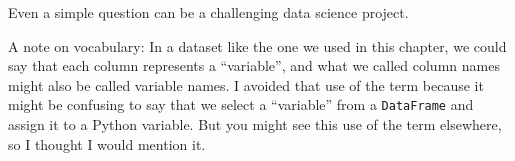 Even a simple question can be a challenging data science project.

A note on vocabulary: In a dataset like the one we used in this chapter,
we could say that each column represents a ``variable'', and what we
called column names might also be called variable names. I avoided that
use of the term because it might be confusing to say that we select a
``variable'' from a \passthrough{\lstinline!DataFrame!} and assign it to
a Python variable. But you might see this use of the term elsewhere, so
I thought I would mention it.

